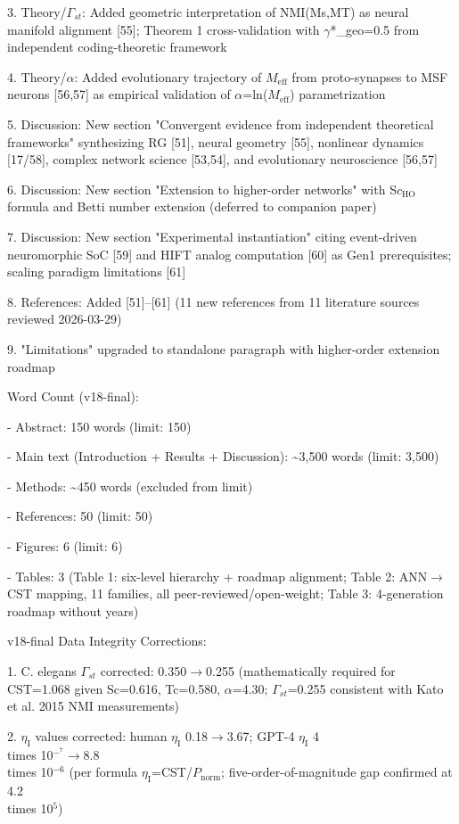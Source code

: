 \documentclass[a4paper,12pt]{article}
\begin{document}
3. Theory/$\Gamma_{st}$: Added geometric interpretation of NMI(Ms,MT) as neural manifold alignment [55]; Theorem 1 cross-validation with $\gamma$*_{geo}=0.5 from independent coding-theoretic framework

4. Theory/$\alpha$: Added evolutionary trajectory of $M_{\text{eff}}$ from proto-synapses to MSF neurons [56,57] as empirical validation of $\alpha$=ln($M_{\text{eff}}$) parametrization

5. Discussion: New section "Convergent evidence from independent theoretical frameworks" synthesizing RG [51], neural geometry [55], nonlinear dynamics [17/58], complex network science [53,54], and evolutionary neuroscience [56,57]

6. Discussion: New section "Extension to higher-order networks" with S$c_{\text{HO}}$ formula and Betti number extension (deferred to companion paper)

7. Discussion: New section "Experimental instantiation" citing event-driven neuromorphic SoC [59] and HIFT analog computation [60] as Gen1 prerequisites; scaling paradigm limitations [61]

8. References: Added [51]--[61] (11 new references from 11 literature sources reviewed 2026-03-29)

9. "Limitations" upgraded to standalone paragraph with higher-order extension roadmap

Word Count (v18-final):

- Abstract: 150 words \checkmark (limit: 150)

- Main text (Introduction + Results + Discussion): \textasciitilde{}3,500 words \checkmark (limit: 3,500)

- Methods: \textasciitilde{}450 words (excluded from limit)

- References: 50 \checkmark (limit: 50)

- Figures: 6 \checkmark (limit: 6)

- Tables: 3 (Table 1: six-level hierarchy + roadmap alignment; Table 2: ANN$\rightarrow$CST mapping, 11 families, all peer-reviewed/open-weight; Table 3: 4-generation roadmap without years)

v18-final Data Integrity Corrections:

1. C. elegans $\Gamma_{st}$ corrected: 0.350$\rightarrow$0.255 (mathematically required for CST=1.068 given Sc=0.616, Tc=0.580, $\alpha$=4.30; $\Gamma_{st}$=0.255 consistent with Kato et al. 2015 NMI measurements)

2. $\eta_{\text{I}}$ values corrected: human $\eta_{\text{I}}$ 0.18$\rightarrow$3.67; GPT-4 $\eta_{\text{I}}$ 4 \\times 10$^{-}^7\rightarrow$8.8 \\times 10$^{-6}$ (per formula $\eta_{\text{I}}$=CST/$P_{\text{norm}}$; five-order-of-magnitude gap confirmed at 4.2 \\times 10$^5$)
\end{document}
